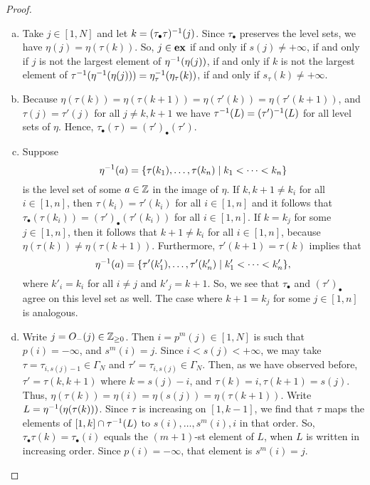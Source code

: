 \begin{proof}\leavevmode
	\begin{enumerate}[(a)]
		\item Take $j\in [1, N]$ and let $k = (\tau_\bullet \tau)^{-1}(j)$. Since $\tau_\bullet$
		      preserves the level sets, we have $\eta(j) = \eta(\tau(k))$. So, $j \in \mathbf{ex}$ if and
		      only if $s(j) \neq + \infty$, if and only if $j$ is not the largest element of
		      $\eta^{-1}(\eta(j))$, if and only if $k$ is not the largest element of
		      $\tau^{-1}(\eta^{-1}(\eta(j))) = \eta_\tau^{-1}(\eta_\tau(k))$, if and only if $s_\tau(k)
			      \neq + \infty$.
		\item Because $\eta(\tau(k)) = \eta(\tau(k+1)) = \eta(\tau'(k)) = \eta(\tau'(k+1))$, and
		      $\tau(j) = \tau'(j)$ for all $j\neq k, k+1$ we have $\tau^{-1}(L) = (\tau')^{-1}(L)$ for
		      all level sets of $\eta$. Hence, $\tau_\bullet(\tau) = (\tau')_\bullet(\tau')$.
		\item Suppose
		      \begin{equation*}
			      \eta^{-1}(a) = \{\tau(k_1), \dots, \tau(k_n) \mid k_1 < \dots < k_n\}
		      \end{equation*}
		      is the level set of some $a\in \mathbb{Z}$ in the image of $\eta$. If $k, k+1 \neq k_i$ for
		      all $i \in [1, n]$, then $\tau(k_i) = \tau'(k_i)$ for all $i\in [1, n]$ and it follows
		      that $\tau_\bullet (\tau(k_i)) = (\tau')_\bullet (\tau'(k_i))$ for all $i\in [1, n]$.
		      If $k = k_j$ for some $j \in [1, n]$, then it follows that $k+1 \neq k_i$ for all $i\in
			      [1, n]$, because $\eta(\tau(k)) \neq \eta(\tau(k+1))$. Furthermore, $\tau'(k+1) =
			      \tau(k)$ implies that
		      \begin{equation*}
			      \eta^{-1}(a) = \{\tau'(k'_1), \dots, \tau'(k'_n)
			      \mid k'_1 < \cdots < k'_n\}	,
		      \end{equation*}
		      where $k'_i = k_i$ for all $i \neq j$ and $k'_j = k+1$. So, we see that $\tau_\bullet$
		      and $(\tau')_\bullet$ agree on this level set as well. The case where $k+1 = k_j$ for
		      some $j\in [1, n]$ is analogous.
		\item Write $j = O_{-}(j) \in \mathbb{Z}_{\geq 0}$. Then $i = p^m(j) \in [1, N]$ is such that $p(i)
			      = -\infty$, and $s^m(i) = j$. Since $i < s(j) < + \infty$, we may take $\tau = \tau_{i,
				      s(j) - 1}\in \Gamma_N$ and $\tau' = \tau_{i, s(j)} \in \Gamma_N$. Then, as we have
		      observed before, $\tau' = \tau(k, k+1)$ where $k = s(j) - i$, and $\tau(k) = i,
			      \tau(k+1) = s(j)$. Thus, $\eta(\tau(k)) = \eta(i) = \eta(s(j)) = \eta(\tau(k+1))$.
		      Write $L = \eta^{-1}(\eta(\tau(k)))$. Since $\tau$ is increasing on $[1, k - 1]$, we
		      find that $\tau$ maps the elements of $[1, k] \cap \tau^{-1}(L)$ to $s(i), \dots,
			      s^m(i), i$ in that order. So, $\tau_\bullet\tau(k) = \tau_\bullet(i)$ equals the
		      $(m+1)$-st element of $L$, when $L$ is written in increasing order. Since $p(i) =
			      -\infty$, that element is $s^m(i) = j$.
	\end{enumerate}
\end{proof}

